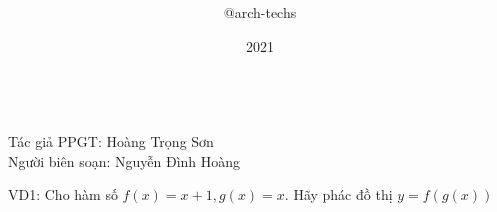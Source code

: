 \documentclass[12pt,a4paper]{report}
\title{\framebox {
        \textcolor{TEcolor}{
            \Huge {    AP/College Physics 1    }
        }
    }    }
\author{\Large @arch-techs}
\date{2021}
\begin{document}
{\selectfont

\begin{center}
    \framebox{
      \Large \textcolor{TEcolor}{HIỂU RÕ PHƯƠNG PHÁP GHÉP TRỤC}
} \\
\vspace{0.5cm}
\textcolor{TEcolor}{Tác giả PPGT: Hoàng Trọng Sơn \\ Người biên soạn: Nguyễn Đình Hoàng}
\end{center}


VD1: Cho hàm số $f(x) = x + 1, g(x) = x $. Hãy phác đồ thị $y = f(g(x))$

}
\end{document}
